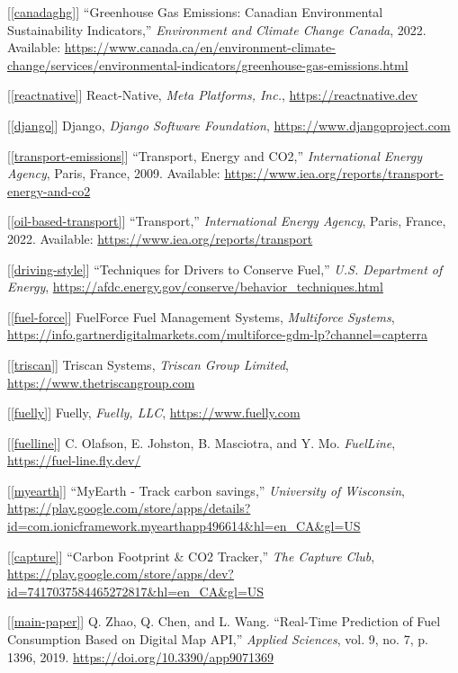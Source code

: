 \documentclass[11pt, oneside]{article}
\newcommand{\refinit}[1]{\noindent \hangindent=0.6cm [\ref*{#1}]}  %
\begin{document}
\begin{footnotesize}

\refinit{canadaghg} ``Greenhouse Gas Emissions: Canadian Environmental Sustainability Indicators,'' \textit{Environment and Climate Change Canada}, 2022. Available: \url{https://www.canada.ca/en/environment-climate-change/services/environmental-indicators/greenhouse-gas-emissions.html}

\refinit{reactnative} React-Native, \textit{Meta Platforms, Inc.}, \url{https://reactnative.dev}

\refinit{django} Django, \textit{Django Software Foundation}, \url{https://www.djangoproject.com}

\refinit{transport-emissions} ``Transport, Energy and CO2,'' \textit{International Energy Agency}, Paris, France, 2009. Available: \url{https://www.iea.org/reports/transport-energy-and-co2}

\refinit{oil-based-transport} ``Transport,'' \textit{International Energy Agency}, Paris, France, 2022. Available: \url{https://www.iea.org/reports/transport}

\refinit{driving-style} ``Techniques for Drivers to Conserve Fuel,'' \textit{U.S. Department of Energy}, \url{https://afdc.energy.gov/conserve/behavior_techniques.html}

\refinit{fuel-force} FuelForce Fuel Management Systems, \textit{Multiforce Systems}, \url{https://info.gartnerdigitalmarkets.com/multiforce-gdm-lp?channel=capterra}

\refinit{triscan} Triscan Systems, \textit{Triscan Group Limited}, \url{https://www.thetriscangroup.com}

\refinit{fuelly} Fuelly, \textit{Fuelly, LLC}, \url{https://www.fuelly.com}

\refinit{fuelline} C. Olafson, E. Johston, B. Masciotra, and Y. Mo. \textit{FuelLine}, \url{https://fuel-line.fly.dev/}

\refinit{myearth} ``MyEarth - Track carbon savings,'' \textit{University of Wisconsin}, \url{https://play.google.com/store/apps/details?id=com.ionicframework.myearthapp496614&hl=en_CA&gl=US}

\refinit{capture} ``Carbon Footprint \& CO2 Tracker,'' \textit{The Capture Club}, \url{https://play.google.com/store/apps/dev?id=7417037584465272817&hl=en_CA&gl=US}

\refinit{main-paper}  Q. Zhao, Q. Chen, and L. Wang. ``Real-Time Prediction of Fuel Consumption Based on Digital Map API,'' \textit{Applied Sciences}, vol. 9, no. 7, p. 1396, 2019. \url{https://doi.org/10.3390/app9071369}


\end{footnotesize}
\end{document}
